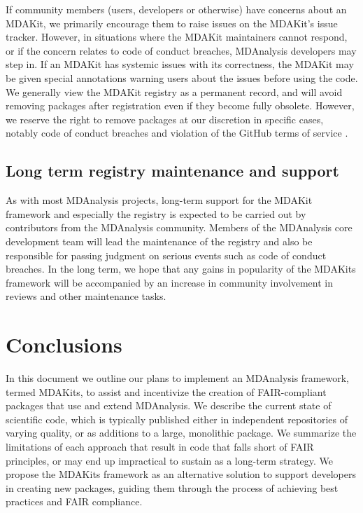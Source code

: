 \documentclass[9pt,whitepaper]{livecoms}
\begin{document}
If community members (users, developers or otherwise) have concerns about an MDAKit, we primarily encourage them to raise issues on the MDAKit’s issue tracker. However, in situations where the MDAKit maintainers cannot respond, or if the concern relates to code of conduct breaches, MDAnalysis developers may step in. If an MDAKit has systemic issues with its correctness, the MDAKit may be given special annotations warning users about the issues before using the code. We generally view the MDAKit registry as a permanent record, and will avoid removing packages after registration even if they become fully obsolete. However, we reserve the right to remove packages at our discretion in specific cases, notably code of conduct breaches and violation of the GitHub terms of service \cite{github_inc_github_2022-1}.

\subsection{Long term registry maintenance and support}
\label{sec:maintenance}

As with most MDAnalysis projects, long-term support for the MDAKit framework and especially the registry is expected to be carried out by contributors from the MDAnalysis community. Members of the MDAnalysis core development team will lead the maintenance of the registry and also be responsible for passing judgment on serious events such as code of conduct breaches. In the long term, we hope that any gains in popularity of the MDAKits framework will be accompanied by an increase in community involvement in reviews and other maintenance tasks.


\section{Conclusions}
\label{sec:conclusions}

In this document we outline our plans to implement an MDAnalysis framework, termed MDAKits, to assist and incentivize the creation of FAIR-compliant packages that use and extend MDAnalysis. We describe the current state of scientific code, which is typically published either in independent repositories of varying quality, or as additions to a large, monolithic package. We summarize the limitations of each approach that result in code that falls short of FAIR principles, or may end up impractical to sustain as a long-term strategy. We propose the MDAKits framework as an alternative solution to support developers in creating new packages, guiding them through the process of achieving best practices and FAIR compliance.
\end{document}

